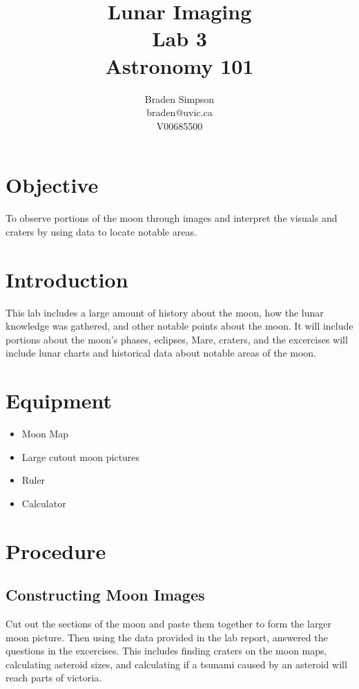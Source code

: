 \documentclass{article}
\begin{document}
\title{Lunar Imaging \\ Lab 3 \\ Astronomy 101}
\author{
Braden Simpson \\ braden@uvic.ca \\ V00685500
}
\maketitle

\section{Objective}
To observe portions of the moon through images and interpret the visuals and craters by using data to locate notable areas.
\section{Introduction}
This lab includes a large amount of history about the moon, how the lunar knowledge was gathered, and other notable points about the moon.  It will include portions about the moon's phases, eclipses, Mare, craters, and the excercises will include lunar charts and historical data about notable areas of the moon.  
\section{Equipment}
\begin{itemize}
\item Moon Map
\item Large cutout moon pictures
\item Ruler
\item Calculator
\end{itemize}
\section{Procedure}
\subsection{Constructing Moon Images}
Cut out the sections of the moon and paste them together to form the larger moon picture.  Then using the data provided in the lab report, answered the questions in the excercises.  This includes finding craters on the 
moon maps, calculating asteroid sizes, and calculating if a tsunami caused by an asteroid will reach parts of victoria.  
\end{document}
